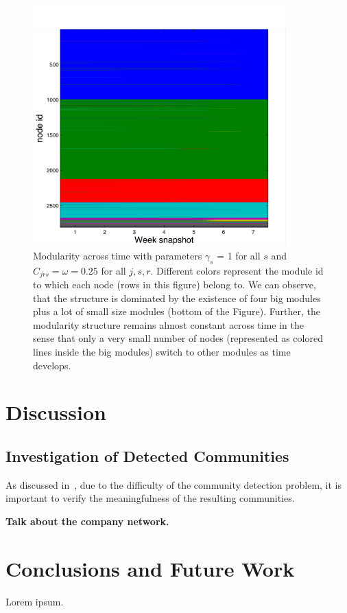 \documentclass[12pt]{article}
\begin{document}
\begin{figure}[!ht]
	\centering
	\includegraphics[width=0.87\textwidth]{Figures/modularity_time}
	\caption{Modularity across time with parameters
		$\gamma_s$ = 1 for all $s$ and $C_{jrs} = \omega=0.25$ for
		all $j,s,r$.
		 Different colors represent
		the module id to which each node (rows in this figure)
		belong to. We can observe, that the structure is dominated
		by the existence of four big modules plus a lot of small
		size modules (bottom of the Figure). Further, the modularity
		structure remains almost constant across time in the sense
		that only a very small number of nodes (represented as colored
		lines inside the big modules) switch to other modules as
		time develops.}
	\label{fig.time.modular}
\end{figure}

\section{Discussion}

\subsection{Investigation of Detected Communities}

As discussed in~\cite{good2010performance}, due to the difficulty of the community detection problem, it is important to verify the meaningfulness of the resulting communities.

\textbf{Talk about the company network.}

\section{Conclusions and Future Work}

Lorem ipsum.



\end{document}
